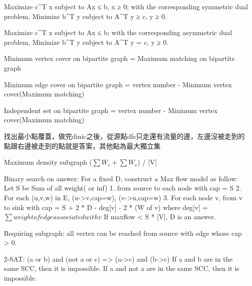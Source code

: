 Maximize c^T x subject to Ax ≤ b, x ≥ 0;
with the corresponding symmetric dual problem,
Minimize b^T y subject to A^T y ≥ c, y ≥ 0.

Maximize c^T x subject to Ax ≤ b;
with the corresponding asymmetric dual problem,
Minimize b^T y subject to A^T y = c, y ≥ 0. 

Minimum vertex cover on bipartite graph =
Maximum matching on bipartite graph

Minimum edge cover on bipartite graph =
vertex number - Minimum vertex cover(Maximum matching)

Independent set on bipartite graph =
vertex number - Minimum vertex cover(Maximum matching)

找出最小點覆蓋，做完dinic之後，從源點dfs只走還有流量的邊，左邊沒被走到的點跟右邊被走到的點就是答案，其他點為最大獨立集

Maximum density subgraph ($\sum W_e+\sum W_v$) / |V|

Binary search on answer:
For a fixed D, construct a Max flow model as follow:
Let S be Sum of all weight( or inf)
1. from source to each node with cap = S
2. For each (u,v,w) in E, (u->v,cap=w), (v->u,cap=w)
3. For each node v, from v to sink with cap = S + 2 * D - deg[v] - 2 * (W of v)
where deg[v] = $\sum weight of edge associated with v$
If maxflow < S * |V|, D is an answer.

Requiring subgraph: all vertex can be reached from source with
edge whose cap > 0.

2-SAT: (a or b) and (not a or c) => (a->c) and (b->c)
If a and b are in the same SCC, then it is impossible.
If a and not a are in the same SCC, then it is impossible.
